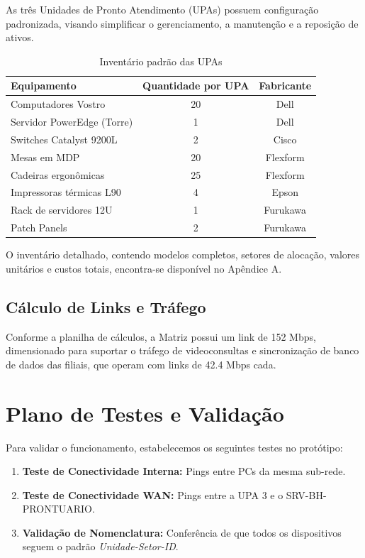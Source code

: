 \documentclass[12pt,a4paper,oneside]{report}
\begin{document}
As três Unidades de Pronto Atendimento (UPAs) possuem configuração padronizada, visando simplificar o gerenciamento, a manutenção e a reposição de ativos.

\begin{table}[H]
\centering
\caption{Inventário padrão das UPAs}
\label{tab:inventario_upas}
\begin{tabular}{lcc}
\toprule
\textbf{Equipamento} & \textbf{Quantidade por UPA} & \textbf{Fabricante} \\
\midrule
Computadores Vostro & 20 & Dell \\
Servidor PowerEdge (Torre) & 1 & Dell \\
Switches Catalyst 9200L & 2 & Cisco \\
Mesas em MDP & 20 & Flexform \\
Cadeiras ergonômicas & 25 & Flexform \\
Impressoras térmicas L90 & 4 & Epson \\
Rack de servidores 12U & 1 & Furukawa \\
Patch Panels & 2 & Furukawa \\
\bottomrule
\end{tabular}
\end{table}

O inventário detalhado, contendo modelos completos, setores de alocação, valores unitários e custos totais, encontra-se disponível no Apêndice A.


\subsection{Cálculo de Links e Tráfego}
Conforme a planilha de cálculos, a Matriz possui um link de 152 Mbps, dimensionado para suportar o tráfego de videoconsultas e sincronização de banco de dados das filiais, que operam com links de 42.4 Mbps cada.

\section{Plano de Testes e Validação}
Para validar o funcionamento, estabelecemos os seguintes testes no protótipo:
\begin{enumerate}
    \item \textbf{Teste de Conectividade Interna:} Pings entre PCs da mesma sub-rede.
    \item \textbf{Teste de Conectividade WAN:} Pings entre a UPA 3 e o SRV-BH-PRONTUARIO.
    \item \textbf{Validação de Nomenclatura:} Conferência de que todos os dispositivos seguem o padrão \textit{Unidade-Setor-ID}.
\end{enumerate}
\end{document}
